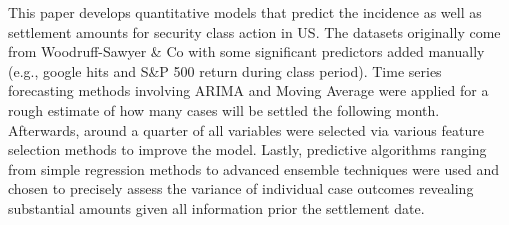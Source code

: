 This paper develops quantitative models that predict the incidence as well as settlement amounts for security class action in US. The datasets originally come from Woodruff-Sawyer \& Co with some significant predictors added manually (e.g., google hits and S\&P 500 return during class period). Time series forecasting methods involving ARIMA and Moving Average were applied for a rough estimate of how many cases will be settled the following month. Afterwards, around a quarter of all variables were selected via various feature selection methods to improve the model. Lastly, predictive algorithms ranging from simple regression methods to advanced ensemble techniques were used and chosen to precisely assess the variance of individual case outcomes revealing substantial amounts given all information prior the settlement date. 